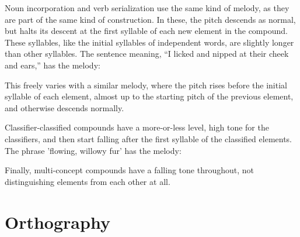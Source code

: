 Noun incorporation and verb serialization use the same kind of melody, as they
are part of the same kind of construction. In these, the pitch descends as
normal, but halts its descent at the first syllable of each new element in the
compound. These syllables, like the initial syllables of independent words, are
slightly longer than other syllables. The sentence
 meaning, ``I licked and nipped at their
cheek and ears,'' has the melody:

\begin{center}
\end{center}\vspace{-1em}

\noindent This freely varies with a similar melody, where the pitch rises before
the initial syllable of each element, almost up to the starting pitch of the
previous element, and otherwise descends normally.

\begin{center}
\end{center}\vspace{-1em}

\noindent Classifier-classified compounds have a more-or-less level, high tone
for the classifiers, and then start falling after the first syllable of the
classified elements. The phrase  'flowing, willowy fur'
has the melody:

\begin{center}
\end{center}\vspace{-1em}

\noindent Finally, multi-concept compounds have a falling tone throughout, not
distinguishing elements from each other at all.

\pagebreak
\section{Orthography}
